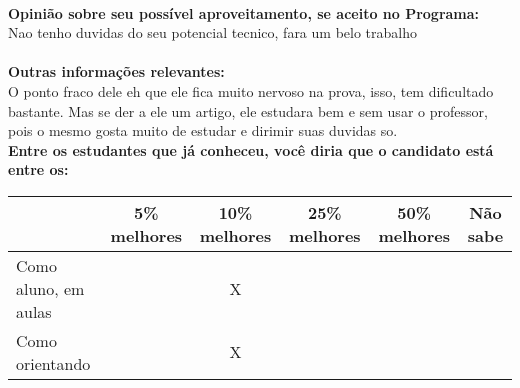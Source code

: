\documentclass[11pt]{article}
\begin{document}
\\
\textbf{Opinião sobre seu possível aproveitamento, se aceito no Programa:}
\\Nao tenho duvidas do seu potencial tecnico, fara um belo trabalho\\ 
\\
\textbf{Outras informações relevantes:} \\O ponto fraco dele eh que ele fica muito nervoso na prova, isso, tem dificultado bastante. Mas se der a ele um artigo, ele estudara bem e sem usar o professor, pois o mesmo gosta muito de estudar e dirimir suas duvidas so.
\\[0.3cm]
\textbf{Entre os estudantes que já conheceu, você diria que o candidato está entre os:}
\\
\begin{tabular}{|l|c|c|c|c|c|}
\hline
 & 5\% melhores & 10\% melhores & 25\% melhores & 50\% melhores & Não sabe \\
\hline
Como aluno, em aulas &  & X &  &  & \\
\hline
Como orientando &  & X &  &  & \\
\hline
\end{tabular}
\end{document}
